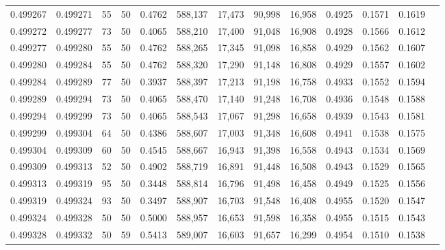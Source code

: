 \begin{tabular}{rrrrrrrrrrrrr}
0.499267 & 0.499271 &    55 &  50 &                                     0.4762 & 588,137 &  17,473 &  90,998 &  16,958 & 0.4925 & 0.1571 & 0.1619 \\
0.499272 & 0.499277 &    73 &  50 &                                     0.4065 & 588,210 &  17,400 &  91,048 &  16,908 & 0.4928 & 0.1566 & 0.1612 \\
0.499277 & 0.499280 &    55 &  50 &                                     0.4762 & 588,265 &  17,345 &  91,098 &  16,858 & 0.4929 & 0.1562 & 0.1607 \\
0.499280 & 0.499284 &    55 &  50 &                                     0.4762 & 588,320 &  17,290 &  91,148 &  16,808 & 0.4929 & 0.1557 & 0.1602 \\
0.499284 & 0.499289 &    77 &  50 &                                     0.3937 & 588,397 &  17,213 &  91,198 &  16,758 & 0.4933 & 0.1552 & 0.1594 \\
0.499289 & 0.499294 &    73 &  50 &                                     0.4065 & 588,470 &  17,140 &  91,248 &  16,708 & 0.4936 & 0.1548 & 0.1588 \\
0.499294 & 0.499299 &    73 &  50 &                                     0.4065 & 588,543 &  17,067 &  91,298 &  16,658 & 0.4939 & 0.1543 & 0.1581 \\
0.499299 & 0.499304 &    64 &  50 &                                     0.4386 & 588,607 &  17,003 &  91,348 &  16,608 & 0.4941 & 0.1538 & 0.1575 \\
0.499304 & 0.499309 &    60 &  50 &                                     0.4545 & 588,667 &  16,943 &  91,398 &  16,558 & 0.4943 & 0.1534 & 0.1569 \\
0.499309 & 0.499313 &    52 &  50 &                                     0.4902 & 588,719 &  16,891 &  91,448 &  16,508 & 0.4943 & 0.1529 & 0.1565 \\
0.499313 & 0.499319 &    95 &  50 &                                     0.3448 & 588,814 &  16,796 &  91,498 &  16,458 & 0.4949 & 0.1525 & 0.1556 \\
0.499319 & 0.499324 &    93 &  50 &                                     0.3497 & 588,907 &  16,703 &  91,548 &  16,408 & 0.4955 & 0.1520 & 0.1547 \\
0.499324 & 0.499328 &    50 &  50 &                                     0.5000 & 588,957 &  16,653 &  91,598 &  16,358 & 0.4955 & 0.1515 & 0.1543 \\
0.499328 & 0.499332 &    50 &  59 &                                     0.5413 & 589,007 &  16,603 &  91,657 &  16,299 & 0.4954 & 0.1510 & 0.1538 \\

\end{tabular}

